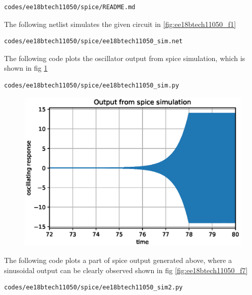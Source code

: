 \begin{enumerate}[label=\arabic*.,ref=\theenumi]
\begin{lstlisting}
codes/ee18btech11050/spice/README.md
\end{lstlisting}

The following netlist simulates the given circuit in \ref{fig:ee18btech11050_f1}

\begin{lstlisting}
codes/ee18btech11050/spice/ee18btech11050_sim.net
\end{lstlisting}

The following code plots the oscillator output from spice simulation, which is shown in fig \ref{fig:ee18btech11050_f6}

\begin{lstlisting}
codes/ee18btech11050/spice/ee18btech11050_sim.py
\end{lstlisting}

\begin{figure}[!ht]
\centering
\includegraphics[width=\columnwidth]{./figs/ee18btech11050/ee18btech11050_sim.eps}
\caption{}
\label{fig:ee18btech11050_f6}
\end{figure}

The following code plots a part of spice output generated above, where a sinusoidal output can be clearly observed shown in fig \ref{fig:ee18btech11050_f7}

\begin{lstlisting}
codes/ee18btech11050/spice/ee18btech11050_sim2.py
\end{lstlisting}


\end{enumerate}
